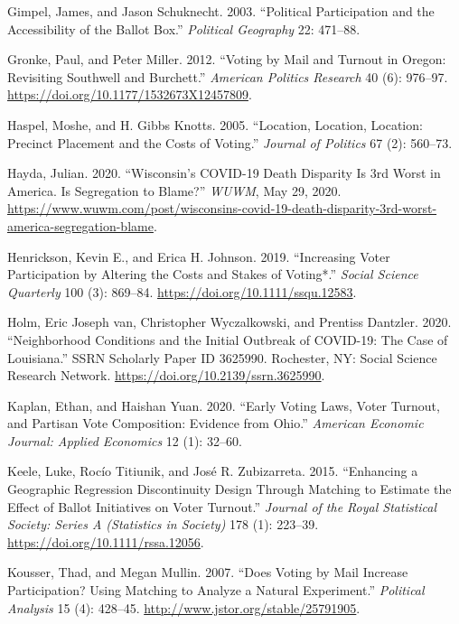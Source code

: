 \documentclass[
  12pt,
]{article}
\newlength{\cslhangindent}
\newenvironment{cslreferences}%
  {\setlength{\parindent}{0pt}%
  \everypar{\setlength{\hangindent}{\cslhangindent}}\ignorespaces}%
  {\par}
\begin{document}
\begin{cslreferences}
\leavevmode\hypertarget{ref-Gimpel2003}{}%
Gimpel, James, and Jason Schuknecht. 2003. ``Political Participation and the Accessibility of the Ballot Box.'' \emph{Political Geography} 22: 471--88.

\leavevmode\hypertarget{ref-Gronke2012}{}%
Gronke, Paul, and Peter Miller. 2012. ``Voting by Mail and Turnout in Oregon: Revisiting Southwell and Burchett.'' \emph{American Politics Research} 40 (6): 976--97. \url{https://doi.org/10.1177/1532673X12457809}.

\leavevmode\hypertarget{ref-Haspel2005}{}%
Haspel, Moshe, and H. Gibbs Knotts. 2005. ``Location, Location, Location: Precinct Placement and the Costs of Voting.'' \emph{Journal of Politics} 67 (2): 560--73.

\leavevmode\hypertarget{ref-Hayda2020}{}%
Hayda, Julian. 2020. ``Wisconsin's COVID-19 Death Disparity Is 3rd Worst in America. Is Segregation to Blame?'' \emph{WUWM}, May 29, 2020. \url{https://www.wuwm.com/post/wisconsins-covid-19-death-disparity-3rd-worst-america-segregation-blame}.

\leavevmode\hypertarget{ref-Henrickson2019}{}%
Henrickson, Kevin E., and Erica H. Johnson. 2019. ``Increasing Voter Participation by Altering the Costs and Stakes of Voting*.'' \emph{Social Science Quarterly} 100 (3): 869--84. \url{https://doi.org/10.1111/ssqu.12583}.

\leavevmode\hypertarget{ref-vanHolm2020}{}%
Holm, Eric Joseph van, Christopher Wyczalkowski, and Prentiss Dantzler. 2020. ``Neighborhood Conditions and the Initial Outbreak of COVID-19: The Case of Louisiana.'' SSRN Scholarly Paper ID 3625990. Rochester, NY: Social Science Research Network. \url{https://doi.org/10.2139/ssrn.3625990}.

\leavevmode\hypertarget{ref-Kaplan2020}{}%
Kaplan, Ethan, and Haishan Yuan. 2020. ``Early Voting Laws, Voter Turnout, and Partisan Vote Composition: Evidence from Ohio.'' \emph{American Economic Journal: Applied Economics} 12 (1): 32--60.

\leavevmode\hypertarget{ref-Keele2015}{}%
Keele, Luke, Rocío Titiunik, and José R. Zubizarreta. 2015. ``Enhancing a Geographic Regression Discontinuity Design Through Matching to Estimate the Effect of Ballot Initiatives on Voter Turnout.'' \emph{Journal of the Royal Statistical Society: Series A (Statistics in Society)} 178 (1): 223--39. \url{https://doi.org/10.1111/rssa.12056}.

\leavevmode\hypertarget{ref-Kousser2007}{}%
Kousser, Thad, and Megan Mullin. 2007. ``Does Voting by Mail Increase Participation? Using Matching to Analyze a Natural Experiment.'' \emph{Political Analysis} 15 (4): 428--45. \url{http://www.jstor.org/stable/25791905}.


\end{cslreferences}
\end{document}
